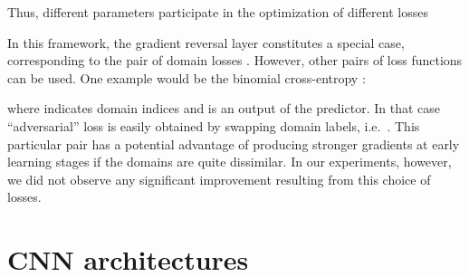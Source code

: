\documentclass{article}
\begin{document}
Thus, different parameters participate in the optimization of different losses

In this framework, the gradient reversal layer constitutes a special case, corresponding  to the pair of domain losses . However, other pairs of loss functions can be used. One example would be the binomial cross-entropy \cite{Goodfellow14}:

where  indicates domain indices and  is an output of the predictor. In that case ``adversarial'' loss is easily obtained by swapping domain labels, i.e.\ . This particular pair has a potential advantage of producing stronger gradients at early learning stages if the domains are quite dissimilar. In our experiments, however, we did not observe any significant improvement resulting from this choice of losses.

\section{CNN architectures}
\label{sect:appendix_archs}
\end{document}
